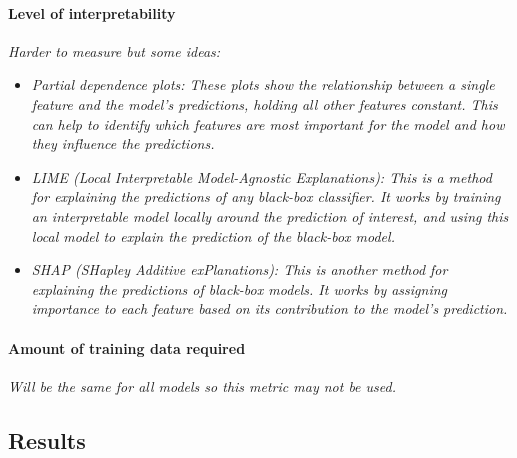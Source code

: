 \paragraph*{Level of interpretability}
\textit{Harder to measure but some ideas: }
\begin{itemize}
    \item \textit{Partial dependence plots: These plots show the relationship between a single
    feature and the model's predictions, holding all other features constant. This can help to
    identify which features are most important for the model and how they influence the
    predictions.}
    \item \textit{LIME (Local Interpretable Model-Agnostic Explanations): This is a method for
    explaining the predictions of any black-box classifier. It works by training an interpretable
    model locally around the prediction of interest, and using this local model to explain the
    prediction of the black-box model.}
    \item \textit{SHAP (SHapley Additive exPlanations): This is another method for explaining the
    predictions of black-box models. It works by assigning importance to each feature based on
    its contribution to the model's prediction.}

\end{itemize}


\paragraph*{Amount of training data required}
\textit{Will be the same for all models so this metric may not be used.}

\subsection{Results}

